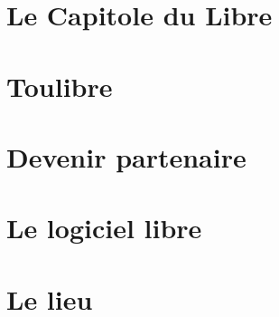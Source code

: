 \documentclass{cdl_sponsor}
\begin{document}

%
%
\section{Le Capitole du Libre}

	

\section{Toulibre}

	

\newpage

\section{Devenir partenaire}

	

\newpage

\section{Le logiciel libre}

	

\section{Le lieu}
\end{document}
